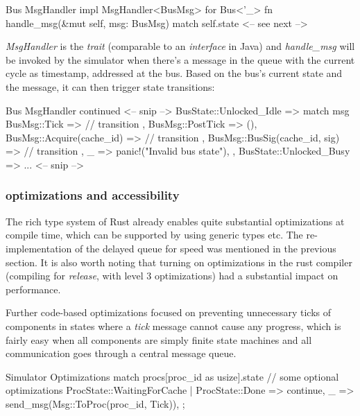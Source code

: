 \documentclass{article}
\begin{document}
\begin{multicols}{2}
\begin{code}[Rust]{Bus MsgHandler}
impl MsgHandler<BusMsg> for Bus<'_> {
    fn handle_msg(&mut self, msg: BusMsg) {
        match self.state {
            <-- see next -->
        }
    }
}
\end{code}

\textit{MsgHandler} is the \textit{trait} (comparable to an \textit{interface} in Java) and \textit{handle\_msg} will be invoked by the simulator when there's a message in the queue with the current cycle as timestamp, addressed at the bus. Based on the bus's current state and the message, it can then trigger state transitions:

\begin{code}[Rust]{Bus MsgHandler continued}
<-- snip -->
BusState::Unlocked_Idle => {
    match msg {
        BusMsg::Tick => {
            // transition
        },
        BusMsg::PostTick => (),
        BusMsg::Acquire(cache_id) => {
            // transition
        },
        BusMsg::BusSig(cache_id, sig) => {
            // transition
        },
        _ => panic!("Invalid bus state"),
    }
},
BusState::Unlocked_Busy => ...
<-- snip -->
\end{code}

\subsubsection{optimizations and accessibility}

The rich type system of Rust already enables quite substantial optimizations at compile time, which can be supported by using generic types etc. The re-implementation of the delayed queue for speed was mentioned in the previous section. It is also worth noting that turning on optimizations in the rust compiler (compiling for \textit{release}, with level 3 optimizations) had a substantial impact on performance.

Further code-based optimizations focused on preventing unnecessary ticks of components in states where a \textit{tick} message cannot cause any progress, which is fairly easy when all components are simply finite state machines and all communication goes through a central message queue.

\begin{code}[Rust]{Simulator Optimizations}
match procs[proc_id as usize].state {
    // some optional optimizations
    ProcState::WaitingForCache | ProcState::Done => continue,
    _ => send_msg(Msg::ToProc(proc_id, Tick)),
};
\end{code}


\end{multicols}
\end{document}
